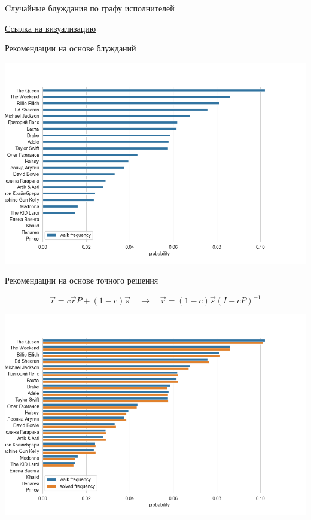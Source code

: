 \documentclass[11pt,aspectratio=169]{beamer}
\begin{document}
\begin{frame}{Cлучайные блуждания по графу исполнителей}

\href{http://localhost:8888/lab/workspaces/auto-u/tree/images/random_walk.gif}{\color{blue}Ссылка на визуализацию}

\end{frame}

\begin{frame}{Рекомендации на основе блужданий}

\begin{center}
\includegraphics[scale=0.4]{images/recommendations-1.png}
\end{center}

\end{frame}

\begin{frame}{Рекомендации на основе точного решения}

\[
\vec{r} = c \vec{r} P + (1 - c) \vec{s} \quad \rightarrow \quad \vec{r} = (1 - c) \vec{s} \left(I - c P \right)^{-1}
\]

\begin{center}
\includegraphics[scale=0.4]{images/recommendations-2.png}
\end{center}

\end{frame}
\end{document}
